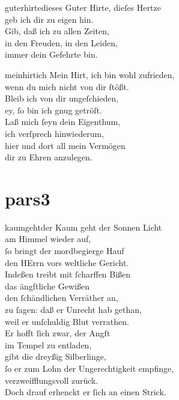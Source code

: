 \documentclass[tocstyle=ref-genre]{ees}
\begin{document}
{\begin{movement}{guterhirtedieses}
  Guter Hirte, dieſes Hertze\\
  geb ich dir zu eigen hin.\\
  Gib, daß ich zu allen Zeiten,\\
  in den Freuden, in den Leiden,\\
  immer dein Gefehrte bin.
\end{movement}

\begin{movement}{meinhirtich}
  \voice[Coro]
  Mein Hirt, ich bin wohl zufrieden,\\
  wenn du mich nicht von dir ſtößt.\\
  Bleib ich von dir ungeſchieden,\\
  ey, ſo bin ich gnug getröſt.\\
  Laß mich ſeyn dein Eigenthum,\\
  ich verſprech hinwiederum,\\
  hier und dort all mein Vermögen\\
  dir zu Ehren anzulegen.
\end{movement}

\part{pars3}

\begin{movement}{kaumgehtder}
  Kaum geht der Sonnen Licht\\
  am Himmel wieder auf,\\
  ſo bringt der mordbegierge Hauf\\
  den HErrn vors weltliche Gericht.\\
  Indeßen treibt mit ſcharffen Bißen\\
  das ängſtliche Gewißen\\
  den ſchändlichen Verräther an,\\
  zu ſagen: daß er Unrecht hab gethan,\\
  weil er unſchuldig Blut verrathen.\\
  Er hofft ſich zwar, der Angſt\\
  im Tempel zu entladen,\\\relax
  [und] gibt die dreyßig Silberlinge,\\
  ſo er zum Lohn der Ungerechtigkeit empfinge,\\
  verzweifflungsvoll zurück.\\
  Doch drauf erhenckt er ſich an einen Strick.


\end{movement}}
\end{document}
